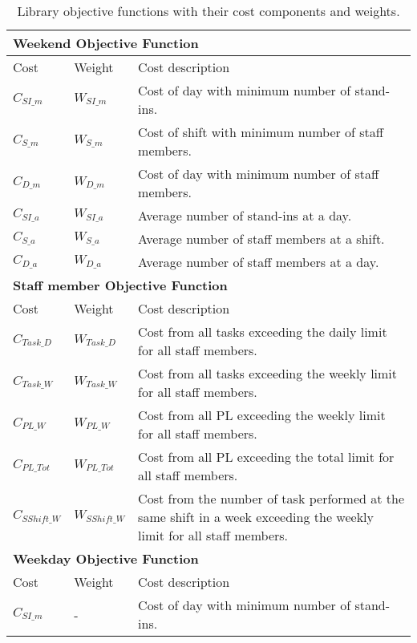 \begin{table}[!h]
\centering
\caption{Library objective functions with their cost components and weights.}
\label{tab:lib_costs}
\begin{tabular}{|l|l|p{7cm}|}
\hline
\multicolumn{3}{|l|}{\cellcolor{gray!90} \textbf{Weekend Objective Function}} \\
\hline 
\rowcolor{Gray} Cost & Weight & Cost description \\ \hline
$C_{SI\_m}$ & $W_{SI\_m}$ & Cost of day with minimum number of stand-ins. \\ \hline
$C_{S\_m}$ & $W_{S\_m}$ & Cost of shift with minimum number of staff members. \\ \hline
$C_{D\_m}$ & $W_{D\_m}$ & Cost of day with minimum number of staff members. \\ \hline
$C_{SI\_a}$ & $W_{SI\_a}$ & Average number of stand-ins at a day. \\ \hline
$C_{S\_a}$ & $W_{S\_a}$ & Average number of staff members at a shift. \\ \hline
$C_{D\_a}$ & $W_{D\_a}$ & Average number of staff members at a day. \\ \hline
\hline
\multicolumn{3}{|l|}{\cellcolor{gray!90} \textbf{Staff member Objective Function}} \\
\hline
\rowcolor{Gray} Cost & Weight & Cost description \\ \hline
$C_{Task\_D}$ & $W_{Task\_D}$ & Cost from all tasks exceeding the daily limit for all staff members. \\ \hline
$C_{Task\_W}$ & $W_{Task\_W}$ & Cost from all tasks exceeding the weekly limit for all staff members. \\ \hline
$C_{PL\_W}$ & $W_{PL\_W}$ & Cost from all PL exceeding the weekly limit for all staff members. \\ \hline
$C_{PL\_Tot}$ & $W_{PL\_Tot}$ & Cost from all PL exceeding the total limit for all staff members. \\ \hline
$C_{SShift\_W}$ & $W_{SShift\_W}$ & Cost from the number of task performed at the same shift in a week exceeding the weekly limit for all staff members. \\ \hline
\hline
 \multicolumn{3}{|l|}{\cellcolor{gray!90} \textbf{Weekday Objective Function}} \\
\hline
\rowcolor{Gray} Cost & Weight & Cost description \\ \hline
$C_{SI\_m}$ & - & Cost of day with minimum number of stand-ins. \\ \hline
\end{tabular}
\end{table}

